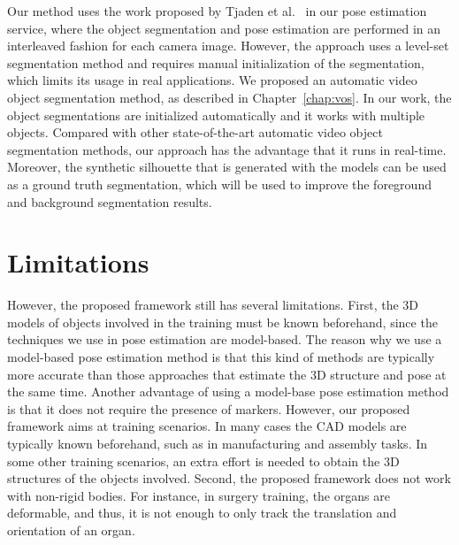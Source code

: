 Our method uses the work proposed by Tjaden et al.~\cite{tjaden2016} in our pose estimation service, where the object segmentation and pose estimation are performed in an interleaved fashion for each camera image.
However, the approach uses a level-set segmentation method and requires manual initialization of the segmentation, which limits its usage in real applications.
We proposed an automatic video object segmentation method, as described in Chapter~\ref{chap:vos}. In our work, the object segmentations are initialized automatically and it works with multiple objects.
Compared with other state-of-the-art automatic video object segmentation methods, our approach has the advantage that it runs in real-time.
Moreover, the synthetic silhouette that is generated with the models can be used as a ground truth segmentation, which will be used to improve the foreground and background segmentation results.

\section{Limitations}
\label{sec:dm:l}

However, the proposed framework still has several limitations.
First, the 3D models of objects involved in the training must be known beforehand, since the techniques we use in pose estimation are model-based.
The reason why we use a model-based pose estimation method is that this kind of methods are typically more accurate than those approaches that estimate the 3D structure and pose at the same time. Another advantage of using a model-base pose estimation method is that it does not require the presence of markers.
However, our proposed framework aims at training scenarios. In many cases the CAD models are typically known beforehand, such as in manufacturing and assembly tasks.
In some other training scenarios, an extra effort is needed to obtain the 3D structures of the objects involved.
Second, the proposed framework does not work with non-rigid bodies.
For instance, in surgery training, the organs are deformable, and thus, it is not enough to only track the translation and orientation of an organ.
